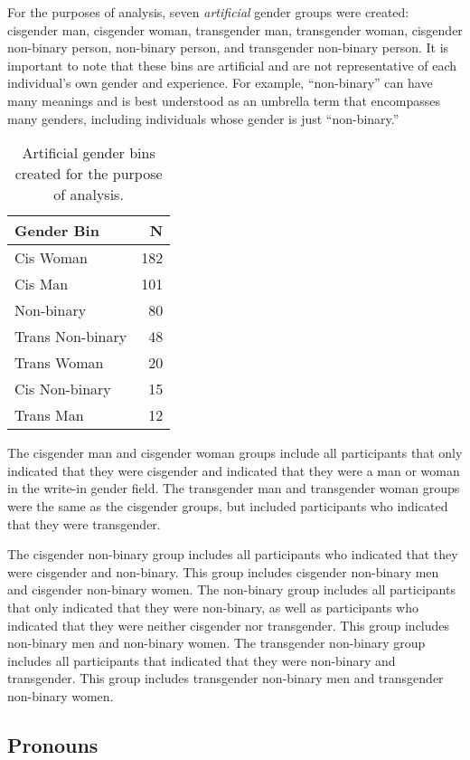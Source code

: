 \documentclass[12pt,twoside]{reedthesis}
\begin{document}
For the purposes of analysis, seven \emph{artificial} gender groups were created: cisgender man, cisgender woman, transgender man, transgender woman, cisgender non-binary person, non-binary person, and transgender non-binary person. It is important to note that these bins are artificial and are not representative of each individual's own gender and experience. For example, ``non-binary'' can have many meanings and is best understood as an umbrella term that encompasses many genders, including individuals whose gender is just ``non-binary.''
\begin{longtable}[t]{lr}
\caption{\label{tab:unnamed-chunk-1}Artificial gender bins created for the purpose of analysis.}\\
\toprule
Gender Bin & N\\
\midrule
Cis Woman & 182\\
Cis Man & 101\\
Non-binary & 80\\
Trans Non-binary & 48\\
Trans Woman & 20\\
\addlinespace
Cis Non-binary & 15\\
Trans Man & 12\\
\bottomrule
\end{longtable}
The cisgender man and cisgender woman groups include all participants that only indicated that they were cisgender and indicated that they were a man or woman in the write-in gender field. The transgender man and transgender woman groups were the same as the cisgender groups, but included participants who indicated that they were transgender.

The cisgender non-binary group includes all participants who indicated that they were cisgender and non-binary. This group includes cisgender non-binary men and cisgender non-binary women. The non-binary group includes all participants that only indicated that they were non-binary, as well as participants who indicated that they were neither cisgender nor transgender. This group includes non-binary men and non-binary women. The transgender non-binary group includes all participants that indicated that they were non-binary and transgender. This group includes transgender non-binary men and transgender non-binary women.

\hypertarget{pronouns}{%
\subsection{Pronouns}\label{pronouns}}
\end{document}
